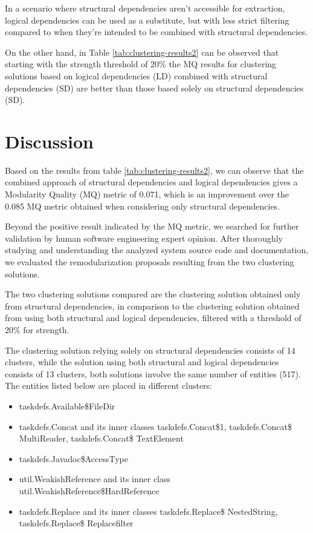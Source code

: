 \documentclass[conference]{IEEEtran}
\begin{document}
In a scenario where structural dependencies aren't accessible for extraction, logical dependencies can be used as a substitute, but with less strict filtering compared to when they're intended to be combined with structural dependencies.


On the other hand, in Table \ref{tab:clustering-results2} can be observed that starting with the strength threshold of 20\% the MQ results for clustering solutions based on logical dependencies (LD) combined with structural dependencies (SD) are better than those based solely on structural dependencies (SD). 


\section{Discussion}
\label{discussion}

Based on the results from table \ref{tab:clustering-results2}, we can observe that the combined approach of structural dependencies and logical dependencies gives a Modularity Quality (MQ) metric of 0.071, which is an improvement over the 0.085 MQ metric obtained when considering only structural dependencies. 

Beyond the positive result indicated by the MQ metric, we searched for further validation by human software engineering expert opinion. After thoroughly studying and understanding the analyzed system source code and documentation, we evaluated the remodularization proposals resulting from the two clustering solutions.

The two clustering solutions compared are the clustering solution obtained only from structural dependencies, in comparison to the clustering solution obtained from using both structural and logical dependencies, filtered with a threshold of 20\% for strength.

The clustering solution relying solely on structural dependencies consists of 14 clusters, while the solution using both structural and logical dependencies consists of 13 clusters, both solutions involve the same number of entities (517). The entities listed below are placed in different clusters: 


\begin{itemize}
    \item taskdefs.Available\$FileDir
    \item taskdefs.Concat and its inner classes taskdefs.Concat\$1, taskdefs.Concat\$ MultiReader, taskdefs.Concat\$ TextElement
    \item taskdefs.Javadoc\$AccessType
    \item util.WeakishReference and its inner class util.WeakishReference\$HardReference
    \item taskdefs.Replace and its inner classes taskdefs.Replace\$ NestedString, taskdefs.Replace\$ Replacefilter
\end{itemize}
\end{document}
